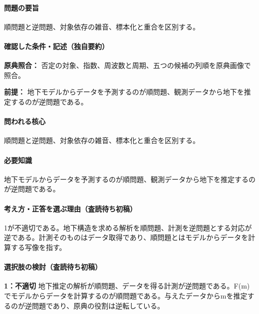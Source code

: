 \paragraph{問題の要旨} 順問題と逆問題、対象依存の雑音、標本化と重合を区別する。

\paragraph{確認した条件・記述（独自要約）}\mbox{}\par

\noindent\textbf{原典照合：} 否定の対象、指数、周波数と周期、五つの候補の列順を原典画像で照合。\par

\noindent\textbf{前提：} 地下モデルからデータを予測するのが順問題、観測データから地下を推定するのが逆問題である。\par

\paragraph{問われる核心} 順問題と逆問題、対象依存の雑音、標本化と重合を区別する。

\paragraph{必要知識} 地下モデルからデータを予測するのが順問題、観測データから地下を推定するのが逆問題である。

\paragraph{考え方・正答を選ぶ理由（査読待ち初稿）} 1が不適切である。地下構造を求める解析を順問題、計測を逆問題とする対応が逆である。計測そのものはデータ取得であり、順問題とはモデルからデータを計算する写像を指す。

\paragraph{選択肢の検討（査読待ち初稿）}\mbox{}\par

\noindent\textbf{1：不適切} 地下推定の解析が順問題、データを得る計測が逆問題である。F(m)でモデルからデータを計算するのが順問題である。与えたデータからmを推定するのが逆問題であり、原典の役割は逆転している。\par

